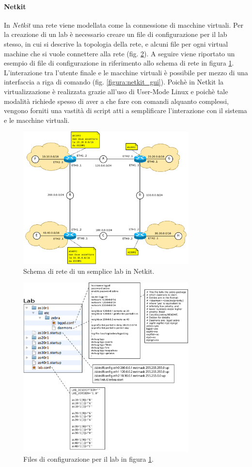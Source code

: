 \paragraph{Netkit}In \textit{Netkit} una rete viene modellata come la connessione di macchine virtuali. Per la creazione di un lab è necessario creare un file di configurazione per il lab stesso, in cui si descrive la topologia della rete, e alcuni file per ogni virtual machine che si vuole connettere alla rete (fig. \ref{figura:netkit_lab_files}). A seguire viene riportato un esempio di file di configurazione in riferimento allo schema di rete in figura \ref{figura:netkit_lab_schema}.\\
L'interazione tra l'utente finale e le macchine virtuali è possibile per mezzo di una interfaccia a riga di comando (fig. \ref{figura:netkit_gui}). Poichè in Netkit la virtualizzazione è realizzata grazie all'uso di User-Mode Linux e poichè tale modalità richiede spesso di aver a che fare con comandi alquanto complessi, vengono forniti una vastità di script atti a semplificare l'interazione con il sistema e le macchine virtuali.

\begin{figure}[!ht]
	\centering
	\includegraphics[width=9cm]{images/netkit_lab.png}
	\caption{Schema di rete di un semplice lab in Netkit.}
	\label{figura:netkit_lab_schema}
\end{figure}

\begin{figure}[!ht]
	\centering
	\includegraphics[width=9cm]{images/netkit_lab_files.png}
	\caption{Files di configurazione per il lab in figura \ref{figura:netkit_lab_schema}.}
	\label{figura:netkit_lab_files}
\end{figure}

